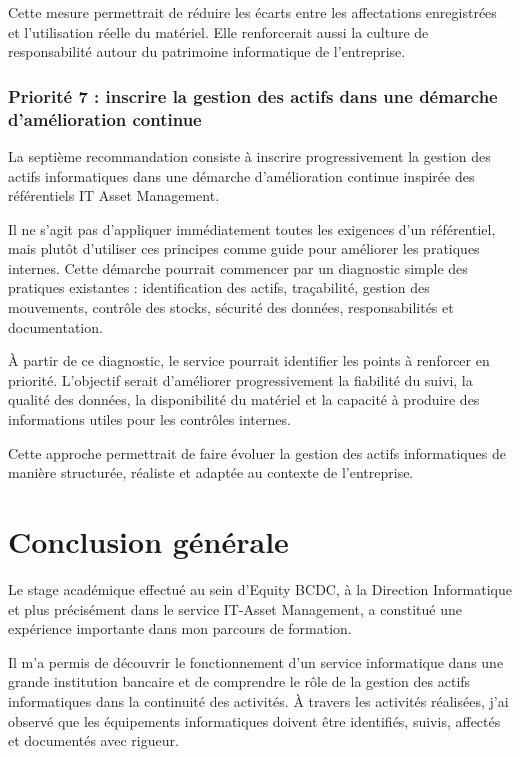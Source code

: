 \documentclass[12pt,a4paper]{report}
\begin{document}
Cette mesure permettrait de réduire les écarts entre les affectations enregistrées et l'utilisation réelle du matériel. Elle renforcerait aussi la culture de responsabilité autour du patrimoine informatique de l'entreprise.

\subsection{Priorité 7 : inscrire la gestion des actifs dans une démarche d'amélioration continue}

La septième recommandation consiste à inscrire progressivement la gestion des actifs informatiques dans une démarche d'amélioration continue inspirée des référentiels IT Asset Management.

Il ne s'agit pas d'appliquer immédiatement toutes les exigences d'un référentiel, mais plutôt d'utiliser ces principes comme guide pour améliorer les pratiques internes. Cette démarche pourrait commencer par un diagnostic simple des pratiques existantes : identification des actifs, traçabilité, gestion des mouvements, contrôle des stocks, sécurité des données, responsabilités et documentation.

À partir de ce diagnostic, le service pourrait identifier les points à renforcer en priorité. L'objectif serait d'améliorer progressivement la fiabilité du suivi, la qualité des données, la disponibilité du matériel et la capacité à produire des informations utiles pour les contrôles internes.

Cette approche permettrait de faire évoluer la gestion des actifs informatiques de manière structurée, réaliste et adaptée au contexte de l'entreprise.

\chapter*{Conclusion générale}

Le stage académique effectué au sein d'Equity BCDC, à la Direction Informatique et plus précisément dans le service IT-Asset Management, a constitué une expérience importante dans mon parcours de formation.

Il m'a permis de découvrir le fonctionnement d'un service informatique dans une grande institution bancaire et de comprendre le rôle de la gestion des actifs informatiques dans la continuité des activités. À travers les activités réalisées, j'ai observé que les équipements informatiques doivent être identifiés, suivis, affectés et documentés avec rigueur.
\end{document}
